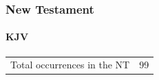 			
		
		
	\subsubsection{New Testament} %
		\label{RIGHTEOUSNESS-NT}
	
		\paragraph{KJV}
			\label{RIGHTEOUSNESS-NT-KJV}
			
	
			\begin{tabular}{ll}
				Total occurrences in the NT & 99
			\end{tabular}
			
